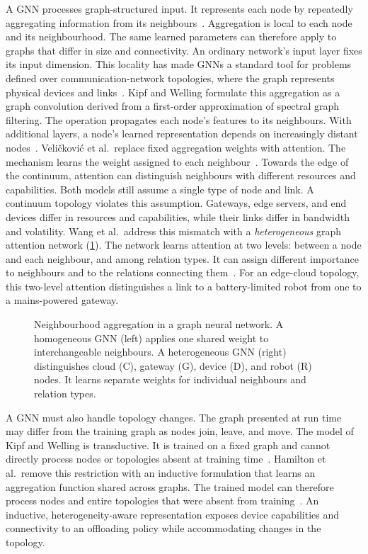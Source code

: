 A \ac{GNN} processes graph-structured input.
It represents each node by repeatedly aggregating information from its neighbours~\cite{DBLP:conf/iclr/KipfW17}.
%
Aggregation is local to each node and its neighbourhood.
The same learned parameters can therefore apply to graphs that differ in size and connectivity.
An ordinary network's input layer fixes its input dimension.
%
This locality has made \acp{GNN} a standard tool for problems defined over communication-network topologies,
where the graph represents physical devices and links~\cite{DBLP:journals/wc/LeeYDL22}.
%
Kipf and Welling formulate this aggregation as a graph convolution derived from a first-order approximation of spectral graph filtering.
The operation propagates each node's features to its neighbours.
With additional layers, a node's learned representation depends on increasingly distant nodes~\cite{DBLP:conf/iclr/KipfW17}.
%
Veli\v{c}kovi\'{c} et al.\ replace fixed aggregation weights with attention.
The mechanism learns the weight assigned to each neighbour~\cite{DBLP:conf/iclr/VelickovicCCRLB18}.
Towards the edge of the continuum, attention can distinguish neighbours with different resources and capabilities.
%
Both models still assume a single type of node and link.
A continuum topology violates this assumption.
Gateways, edge servers, and end devices differ in resources and capabilities, while their links differ in bandwidth and volatility.
%
Wang et al.\ address this mismatch with a \emph{heterogeneous} graph attention network (\cref{fig:gnn-aggregation}).
%
The network learns attention at two levels:
between a node and each neighbour,
and among relation types.
It can assign different importance to neighbours and to the relations connecting them~\cite{DBLP:conf/www/WangJSWCYY19}.
%
For an edge-cloud topology,
this two-level attention distinguishes a link to a battery-limited robot from one to a mains-powered gateway.

\begin{figure}[t]
    \centering
    
    \caption[Neighbourhood aggregation: homogeneous vs.\ heterogeneous GNN]{Neighbourhood aggregation in a graph neural network. A homogeneous GNN (left) applies one shared weight to interchangeable neighbours. A heterogeneous GNN (right) distinguishes cloud (C), gateway (G), device (D), and robot (R) nodes. It learns separate weights for individual neighbours and relation types.}
    \label{fig:gnn-aggregation}
\end{figure}

%
A \ac{GNN} must also handle topology changes.
The graph presented at run time may differ from the training graph as nodes join, leave, and move.
%
The model of Kipf and Welling is transductive.
It is trained on a fixed graph and cannot directly process nodes or topologies absent at training time~\cite{DBLP:conf/iclr/KipfW17}.
%
Hamilton et al.\ remove this restriction with an inductive formulation that learns an aggregation function shared across graphs.
The trained model can therefore process nodes and entire topologies that were absent from training~\cite{DBLP:conf/nips/HamiltonYL17}.
%
An inductive, heterogeneity-aware representation exposes device capabilities and connectivity to an offloading policy while accommodating changes in the topology.
